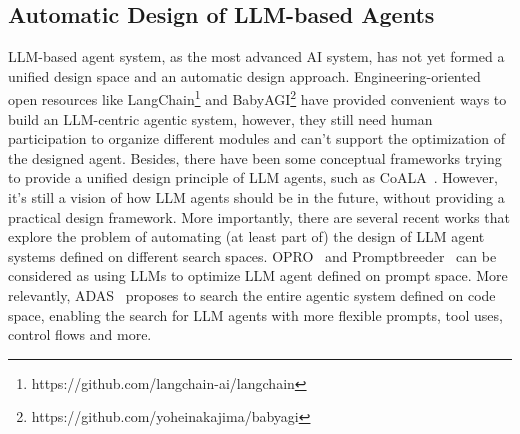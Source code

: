 \subsection{Automatic Design of LLM-based Agents}
LLM-based agent system, as the most advanced AI system, has not yet formed a unified design space and an automatic design approach.
Engineering-oriented open resources like LangChain\footnote{https://github.com/langchain-ai/langchain} and BabyAGI\footnote{https://github.com/yoheinakajima/babyagi} have provided convenient ways to build an LLM-centric agentic system, however, they still need human participation to organize different modules and can't support the optimization of the designed agent.
Besides, there have been some conceptual frameworks trying to provide a unified design principle of LLM agents, such as CoALA~\citep{sumers2023cognitive}. 
However, it's still a vision of how LLM agents should be in the future, without providing a practical design framework.
More importantly, there are several recent works that explore the problem of automating (at least part of) the design of LLM agent systems defined on different search spaces. OPRO~\citep{yang2024large} and Promptbreeder~\citep{fernando2024promptbreeder} can be considered as using LLMs to optimize LLM agent defined on prompt space. More relevantly, ADAS~\citep{hu2024automated} proposes to search the entire agentic system defined on code space, enabling the search for LLM agents with more flexible prompts, tool uses, control flows and more.


